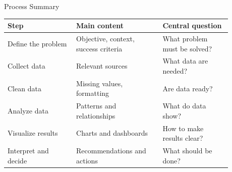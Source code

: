 \documentclass[aspectratio=169,11pt]{beamer}
\begin{document}
\begin{frame}{Process Summary}
\begin{center}\small
\begin{tabular}{p{0.27\linewidth}p{0.34\linewidth}p{0.27\linewidth}}
\toprule
\textbf{Step} & \textbf{Main content} & \textbf{Central question}\\
\midrule
Define the problem & Objective, context, success criteria & What problem must be solved?\\
Collect data & Relevant sources & What data are needed?\\
Clean data & Missing values, formatting & Are data ready?\\
Analyze data & Patterns and relationships & What do data show?\\
Visualize results & Charts and dashboards & How to make results clear?\\
Interpret and decide & Recommendations and actions & What should be done?\\
\bottomrule
\end{tabular}
\end{center}
\end{frame}
\end{document}
